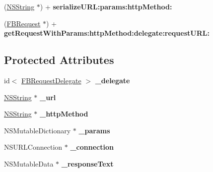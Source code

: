 \begin{DoxyCompactItemize}
\item 
\hypertarget{interface_f_b_request_a4d464c3f3ee693fd58765836ac711dcd}{
(\hyperlink{class_n_s_string}{\-N\-S\-String} $\ast$) + {\bfseries serialize\-U\-R\-L\-:params\-:http\-Method\-:}}
\label{interface_f_b_request_a4d464c3f3ee693fd58765836ac711dcd}

\item 
\hypertarget{interface_f_b_request_ad72a5d444c91c0d8360b14c50ea050c4}{
(\hyperlink{interface_f_b_request}{\-F\-B\-Request} $\ast$) + {\bfseries get\-Request\-With\-Params\-:http\-Method\-:delegate\-:request\-U\-R\-L\-:}}
\label{interface_f_b_request_ad72a5d444c91c0d8360b14c50ea050c4}

\end{DoxyCompactItemize}
\subsection*{\-Protected \-Attributes}
\begin{DoxyCompactItemize}
\item 
\hypertarget{interface_f_b_request_afdb6aa87c91d5232848848b7c5b7235b}{
id$<$ \hyperlink{protocol_f_b_request_delegate-p}{\-F\-B\-Request\-Delegate} $>$ {\bfseries \-\_\-delegate}}
\label{interface_f_b_request_afdb6aa87c91d5232848848b7c5b7235b}

\item 
\hypertarget{interface_f_b_request_a9cdbda493dc847d1e0e4edf3e1c503b0}{
\hyperlink{class_n_s_string}{\-N\-S\-String} $\ast$ {\bfseries \-\_\-url}}
\label{interface_f_b_request_a9cdbda493dc847d1e0e4edf3e1c503b0}

\item 
\hypertarget{interface_f_b_request_ac16ba8c1773f51f1947c563240861822}{
\hyperlink{class_n_s_string}{\-N\-S\-String} $\ast$ {\bfseries \-\_\-http\-Method}}
\label{interface_f_b_request_ac16ba8c1773f51f1947c563240861822}

\item 
\hypertarget{interface_f_b_request_a8c51daa18e0e34a61080fa2d24ba0c80}{
\-N\-S\-Mutable\-Dictionary $\ast$ {\bfseries \-\_\-params}}
\label{interface_f_b_request_a8c51daa18e0e34a61080fa2d24ba0c80}

\item 
\hypertarget{interface_f_b_request_aea611241a3cc27942f2b0be1a28e571f}{
\-N\-S\-U\-R\-L\-Connection $\ast$ {\bfseries \-\_\-connection}}
\label{interface_f_b_request_aea611241a3cc27942f2b0be1a28e571f}

\item 
\hypertarget{interface_f_b_request_a68ac5e488afeb0945f9836e9f4fcc294}{
\-N\-S\-Mutable\-Data $\ast$ {\bfseries \-\_\-response\-Text}}
\label{interface_f_b_request_a68ac5e488afeb0945f9836e9f4fcc294}

\end{DoxyCompactItemize}
